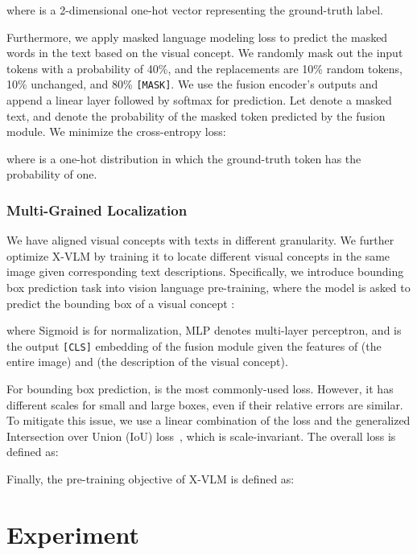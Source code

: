 \documentclass{article}
\newcommand{\baby}{X-VLM\xspace}
\begin{document}
where  is a 2-dimensional one-hot vector representing the ground-truth label.


Furthermore, we apply masked language modeling loss to predict the masked words in the text based on the visual concept. We randomly mask out the input tokens with a probability of 40\%, and the replacements are 10\% random tokens, 10\% unchanged, and 80\% \texttt{[MASK]}. We use the fusion encoder's outputs and append a linear layer followed by softmax for prediction. Let  denote a masked text, and  denote the probability of the masked token  predicted by the fusion module. We minimize the cross-entropy loss:

where  is a one-hot distribution in which the ground-truth token  has the probability of one. 


\subsubsection{Multi-Grained Localization}
We have aligned visual concepts with texts in different granularity. We further optimize \baby by training it to locate different visual concepts in the same image given corresponding text descriptions. Specifically, we introduce bounding box prediction task into vision language pre-training, where the model is asked to predict the bounding box  of a visual concept : 

where Sigmoid is for normalization, MLP denotes multi-layer perceptron, and  is the output \texttt{[CLS]} embedding of the fusion module given the features of  (the entire image) and  (the description of the visual concept). 


For bounding box prediction,  is the most commonly-used loss. However, it has different scales for small and large boxes, even if their relative errors are similar. To mitigate this issue, we use a linear combination of the  loss and the generalized Intersection over Union (IoU) loss~\cite{rezatofighi2019generalized}, which is scale-invariant. The overall loss is defined as: 



Finally, the pre-training objective of \baby is defined as:



 
\section{Experiment}
\end{document}
